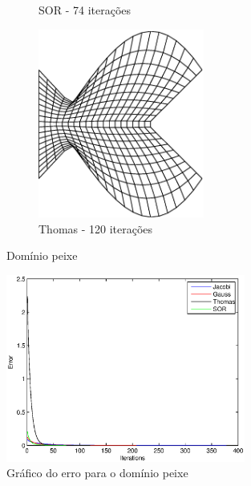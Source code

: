 \documentclass{article}
\begin{document}
\begin{figure}
\begin{subfigure}[b]{0.45\textwidth}
				\caption{SOR - 74 iterações}
			\end{subfigure}
			\begin{subfigure}[b]{0.45\textwidth}
				\centering
				\includegraphics[width=0.6\textwidth]{figures/fish-thomas.eps}
				\caption{Thomas - 120 iterações}
			\end{subfigure}
			\caption{Domínio peixe}
			\label{fig:peixe}
			\centering
			\includegraphics[width=0.7\textwidth]{figures/fish-error.eps}
			\caption{Gráfico do erro para o domínio peixe}
			\label{fig:peixe:erro}
		\end{figure}
\end{document}

